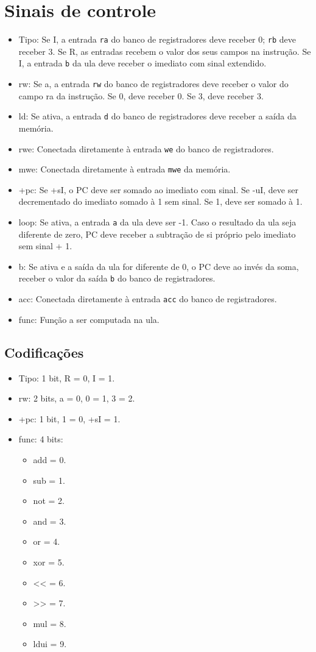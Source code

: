 \documentclass[11pt]{article}
\begin{document}
\section{Sinais de controle}
\label{sec:orgf5976c9}
\begin{itemize}
\item Tipo: Se I, a entrada \texttt{ra} do banco de registradores deve receber 0; \texttt{rb}
deve receber 3. Se R, as entradas recebem o valor dos seus campos na
instrução. Se I, a entrada \texttt{b} da ula deve receber o imediato com sinal
extendido.
\item rw: Se a, a entrada \texttt{rw} do banco de registradores deve receber o valor do
campo ra da instrução. Se 0, deve receber 0. Se 3, deve receber 3.
\item ld: Se ativa, a entrada \texttt{d} do banco de registradores deve receber a saída
da memória.
\item rwe: Conectada diretamente à entrada \texttt{we} do banco de registradores.
\item mwe: Conectada diretamente à entrada \texttt{mwe} da memória.
\item +pc: Se +sI, o PC deve ser somado ao imediato com sinal. Se -uI, deve
ser decrementado do imediato somado à 1 sem sinal. Se 1, deve ser somado
à 1.
\item loop: Se ativa, a entrada \texttt{a} da ula deve ser -1. Caso o resultado da ula
seja diferente de zero, PC deve receber a subtração de si próprio pelo
imediato sem sinal + 1.
\item b: Se ativa e a saída da ula for diferente de 0, o PC deve ao invés da
soma, receber o valor da saída \texttt{b} do banco de registradores.
\item acc: Conectada diretamente à entrada \texttt{acc} do banco de registradores.
\item func: Função a ser computada na ula.
\end{itemize}
\subsection{Codificações}
\label{sec:org1bd915e}
\begin{itemize}
\item Tipo: 1 bit, R = 0, I = 1.
\item rw: 2 bits, a = 0, 0 = 1, 3 = 2.
\item +pc: 1 bit, 1 = 0, +sI = 1.
\item func: 4 bits:
\begin{itemize}
\item add = 0.
\item sub = 1.
\item not = 2.
\item and = 3.
\item or = 4.
\item xor = 5.
\item << = 6.
\item >> = 7.
\item mul = 8.
\item ldui = 9.
\end{itemize}
\end{itemize}
\end{document}
